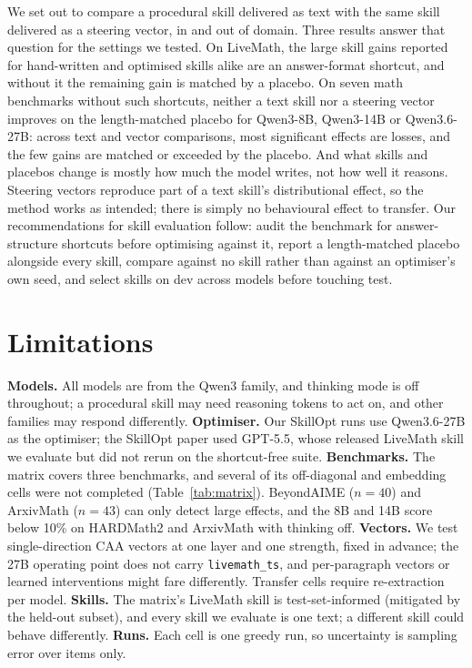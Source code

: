 \documentclass[11pt]{article}
\begin{document}
We set out to compare a procedural skill delivered as text with the same skill delivered as a
steering vector, in and out of domain. Three results answer that question for the settings we
tested. On LiveMath, the large skill gains reported for hand-written and optimised skills alike are
an answer-format shortcut, and without it the remaining gain is matched by a placebo. On seven math
benchmarks without such shortcuts, neither a text skill nor a steering vector improves on the
length-matched placebo for Qwen3-8B, Qwen3-14B or Qwen3.6-27B: across \nTextTests{} text and
\nVecTests{} vector comparisons, most significant effects are losses, and the few gains are matched
or exceeded by the placebo. And what skills and placebos change
is mostly how much the model writes, not how well it reasons. Steering vectors reproduce part of a
text skill's distributional effect, so the method works as intended; there is simply no behavioural
effect to transfer. Our recommendations for skill evaluation follow: audit the benchmark for
answer-structure shortcuts before optimising against it, report a length-matched placebo alongside
every skill, compare against no skill rather than against an optimiser's own seed, and select
skills on dev across models before touching test.

\section*{Limitations}

\textbf{Models.} All models are from the Qwen3 family, and thinking mode is off throughout; a
procedural skill may need reasoning tokens to act on, and other families may respond differently.
\textbf{Optimiser.} Our SkillOpt runs use Qwen3.6-27B as the optimiser; the SkillOpt paper used
GPT-5.5, whose released LiveMath skill we evaluate but did not rerun on the shortcut-free suite.
\textbf{Benchmarks.} The matrix covers three benchmarks, and several of its off-diagonal and
embedding cells were not completed (Table~\ref{tab:matrix}). BeyondAIME ($n=40$) and ArxivMath
($n=43$) can only detect large effects, and the 8B and 14B score below 10\% on HARDMath2 and
ArxivMath with thinking off. \textbf{Vectors.} We test single-direction CAA vectors at one layer and one strength, fixed in
advance; the 27B operating point does not carry \texttt{livemath\_ts}, and per-paragraph vectors or
learned interventions \citep{wu2024reft,wu2025reps} might fare differently. Transfer cells require
re-extraction per model. \textbf{Skills.} The matrix's LiveMath skill is test-set-informed (mitigated
by the held-out subset), and every skill we evaluate is one text; a different skill could behave
differently. \textbf{Runs.} Each cell is one greedy run, so uncertainty is sampling error over items
only.
\end{document}
